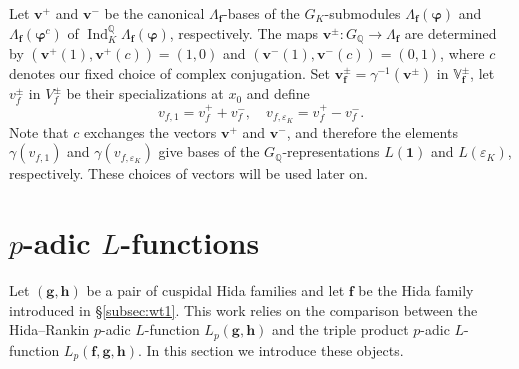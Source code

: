 \documentclass[a4paper,11pt]{amsart}
\theoremstyle{plain}
\theoremstyle{definition}
\theoremstyle{remark}
\newcommand{\bb}{\mathbb}
\DeclareMathOperator{\Ind}{Ind}
\newcommand{\hf}{{\mathbf{f}}}
\newcommand{\hg}{{\mathbf{g}}}
\newcommand{\hh}{{\mathbf h}}
\numberwithin{equation}{section}
\begin{document}
Let $\bm{v}^+$ and $\bm{v}^-$ be the canonical $\Lambda_{\hf}$-bases of the $G_K$-submodules $\Lambda_{\hf}(\bm{\varphi})$ and $\Lambda_{\hf}(\bm{\varphi}^c)$ of $\Ind_K^{\mathbb Q} \Lambda_\hf(\bm{\varphi})$, respectively. The maps $\bm{v}^{\pm} \colon G_{\mathbb Q} \rightarrow \Lambda_{\hf}$ are determined by $(\bm{v}^+(1),\bm{v}^+(c))=(1,0)$ and $(\bm{v}^-(1),\bm{v}^-(c)) = (0,1)$, where $c$ denotes our fixed choice of complex conjugation. Set $\bm{v}_\hf^{\pm} = \gamma^{-1}(\bm{v}^{\pm})$ in $\bb{V}_{\hf}^{\pm}$, let $v_f^{\pm}$ in $V_f^{\pm}$ be their specializations at $x_0$ and define \[ v_{f,1} = v_f^+ + v_f^-, \quad v_{f,\varepsilon_K} = v_f^+ - v_f^-. \] Note that $c$ exchanges the vectors $\bm{v}^+$ and $\bm{v}^-$, and therefore the elements $\gamma(v_{f,1})$ and $\gamma(v_{f,\varepsilon_K})$ give bases of the $G_{\mathbb Q}$-representations $L(\bm{1})$ and $L(\varepsilon_K)$, respectively. These choices of vectors will be used later on.

\section{$p$-adic $L$-functions}

Let $(\hg,\hh)$ be a pair of cuspidal Hida families and let $\hf$ be the Hida family introduced in \S\ref{subsec:wt1}. This work relies on the comparison between the Hida--Rankin $p$-adic $L$-function $L_p(\hg,\hh)$ and the triple product $p$-adic $L$-function $L_p(\hf,\hg,\hh)$. In this section we introduce these objects.
  


\end{document}

